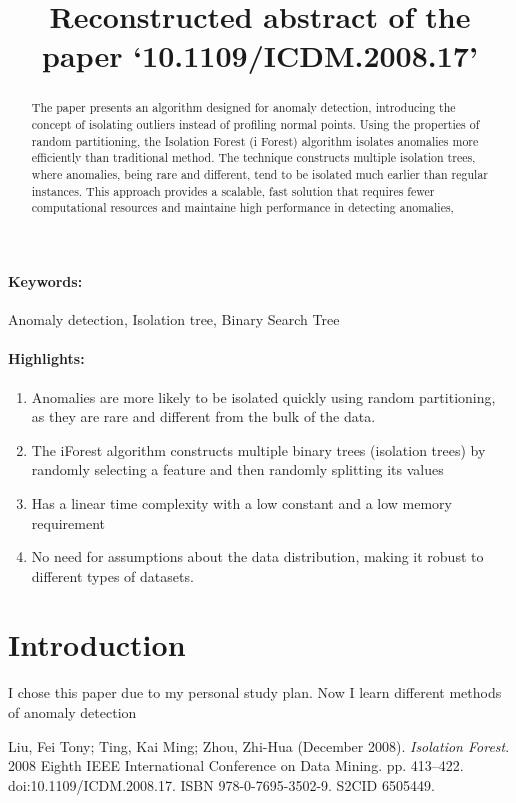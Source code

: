 \documentclass[12pt]{article}
\title{Reconstructed abstract of the paper `10.1109/ICDM.2008.17'}
\date{}
\begin{document}
\maketitle

\begin{abstract}
The paper  presents an algorithm designed for anomaly detection, introducing the concept of isolating outliers instead of profiling normal points. Using the properties of random partitioning, the Isolation Forest (i Forest) algorithm isolates anomalies more efficiently than traditional method. The technique constructs multiple isolation trees, where anomalies, being rare and different, tend to be isolated much earlier than regular instances. This approach provides a scalable, fast solution that requires fewer computational resources and maintaine  high performance in detecting anomalies,
\end{abstract}
\paragraph{Keywords:} Anomaly detection, Isolation tree, Binary
Search Tree

\paragraph{Highlights:}
\begin{enumerate}
\item Anomalies are more likely to be isolated quickly using random partitioning, as they are rare and different from the bulk of the data.
\item The iForest algorithm constructs multiple binary trees (isolation trees) by randomly selecting a feature and then randomly splitting its values
\item Has a
linear time complexity with a low constant and a low memory requirement
\item No need for assumptions about the data distribution, making it robust to different types of datasets.
\end{enumerate}

\section{Introduction}
I chose this paper due to my personal study plan. Now I learn different methods of anomaly detection  


\begin{thebibliography}{9}

Liu, Fei Tony; Ting, Kai Ming; Zhou, Zhi-Hua (December 2008). 
\textit{Isolation Forest}. 2008 Eighth IEEE International Conference on Data Mining. pp. 413–422. doi:10.1109/ICDM.2008.17. ISBN 978-0-7695-3502-9. S2CID 6505449.

\end{thebibliography}
\end{document}
